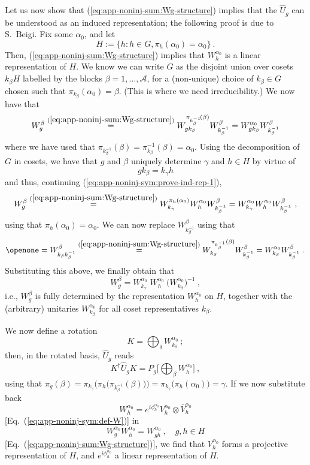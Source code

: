 \documentclass[twocolumn,superscriptaddress,prb,linenumbers]{revtex4-1}
\newcommand{\mc}[1]{\mathcal{#1}}
\begin{document}
Let us now show that (\ref{eq:app-noninj-sum:Wg-structure}) implies that
the $\hat U_g$ can be understood as an induced representation; the following
proof is due to S.~Beigi.\cite{beigi:private} Fix some $\alpha_0$, and let
\[
    H:=\{h:h\in G, \pi_h(\alpha_0)=\alpha_0\}\ .
\]
Then, (\ref{eq:app-noninj-sum:Wg-structure}) implies that $W_h^{\alpha_0}$
is a linear representation of $H$. We know we can write $G$ as the
disjoint union over cosets $k_\beta H$ labelled by the blocks
$\beta=1,\dots,\mc A$, for a (non-unique) choice of $k_\beta\in G$
chosen such that $\pi_{k_\beta}(\alpha_0)=\beta$. (This is where we need
irreducibility.)
We now have that
\begin{equation}
    \label{eq:app-noninj-sym:prove-ind-rep-1}
    W_g^\beta
    \stackrel{(\ref{eq:app-noninj-sum:Wg-structure})}{=}
    W_{gk_\beta}^{ \pi_{k_\beta^{-1}}\!(\beta)} W_{k_\beta^{-1}}^\beta
    =
    W_{gk_\beta}^{\alpha_0} W_{k_\beta^{-1}}^\beta
\end{equation}
where we have used that
$\pi_{k_\beta^{-1}}(\beta)=\pi^{-1}_{k_\beta}(\beta)=\alpha_0$.
Using the decomposition of $G$ in cosets, we have that $g$ and $\beta$
uniquely determine $\gamma$ and $h\in H$ by virtue of
\begin{equation}
    \label{eq:app-noninj-sym:hgamma-from-gbeta}
    gk_\beta = k_\gamma h
\end{equation}
and thus, continuing (\ref{eq:app-noninj-sym:prove-ind-rep-1}),
\[
W_g^\beta
\stackrel{(\ref{eq:app-noninj-sum:Wg-structure})}{=}
W_{k_\gamma}^{\pi_h(\alpha_0)}
W^{\alpha_0}_h W_{k_\beta^{-1}}^\beta
=
W_{k_\gamma}^{\alpha_0}
W^{\alpha_0}_h W_{k_\beta^{-1}}^\beta\ ,
\]
using that $\pi_h(\alpha_0)=\alpha_0$. We can now
replace $W^\beta_{k_\beta^{-1}}$ using that
\[
\openone =
W_{k_\beta k_\beta^{-1}}^\beta
\stackrel{{(\ref{eq:app-noninj-sum:Wg-structure})}}{=}
W^{\pi_{k_\beta^{-1}}(\beta)}_{k_\beta} W^\beta_{k_\beta^{-1}}
=
W^{\alpha_0}_{k_\beta} W^\beta_{k_\beta^{-1}}\ .
\]
Substituting this above, we finally obtain that
\begin{equation}
    \label{eq:app-noninj-sym:Wg-induced-twisted}
    W_g^\beta = W_{k_\gamma}^{\alpha_0}\;
    W^{\alpha_0}_h\: \big(W_{k_\beta}^{\alpha_0}\big)^{-1}\ ,
\end{equation}
i.e., $W_g^\beta$ is fully determined by the representation
$W_h^{\alpha_0}$ on $H$, together with the (arbitrary) unitaries
$W_{k_\beta}^{\alpha_0}$ for all coset representatives $k_\beta$.

We now define a rotation
\[
    K=\bigoplus_\delta W_{k_\delta}^{\alpha_0}\ ;
\]
then, in the rotated basis, $\hat U_g$ reads
\[
    K^\dagger \hat U_g K =
    P_g\bigg[\bigoplus_\beta  W^{\alpha_0}_h \bigg]\ ,
\]
using that
\mbox{$\pi_g(\beta) = \pi_{k_\gamma}\big(\pi_h\big(
        \pi_{k_\beta^{-1}}(\beta)\big)\big)
        = \pi_{k_\gamma}\big(\pi_h(\alpha_0)\big)
        =\gamma$}.
If we now substitute back
\[
    W_h^{\alpha_0} = e^{i\phi^{\alpha_0}_h} V_h^{\alpha_0}\otimes \bar
    V_h^{\alpha_0}
\]
[Eq.~(\ref{eq:app-noninj-sym:def-W})] in
\[
    W_g^{\alpha_0} W_h^{\alpha_0} =
    W_{gh}^{\alpha_0}\ ,\quad g,h\in H
\]
[Eq.~(\ref{eq:app-noninj-sum:Wg-structure})], we find that
$V_h^{\alpha_0}$ forms a
projective representation of $H$, and $e^{i\phi_h^{\alpha_0}}$ a linear
representation of $H$.
\end{document}
